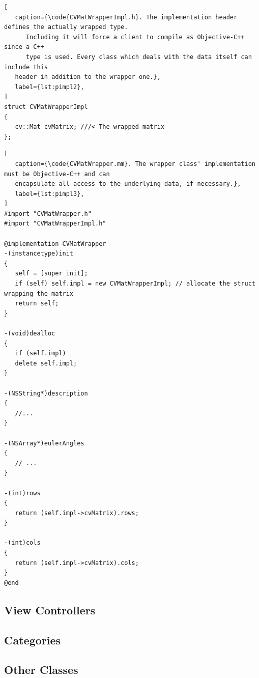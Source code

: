 \begin{lstlisting}[
   caption={\code{CVMatWrapperImpl.h}. The implementation header defines the actually wrapped type.
      Including it will force a client to compile as Objective-C++ since a C++
      type is used. Every class which deals with the data itself can include this
   header in addition to the wrapper one.},
   label={lst:pimpl2},
]
struct CVMatWrapperImpl
{
   cv::Mat cvMatrix; ///< The wrapped matrix
};
\end{lstlisting}

\begin{lstlisting}[
   caption={\code{CVMatWrapper.mm}. The wrapper class' implementation must be Objective-C++ and can
   encapsulate all access to the underlying data, if necessary.},
   label={lst:pimpl3},
]
#import "CVMatWrapper.h"
#import "CVMatWrapperImpl.h"

@implementation CVMatWrapper
-(instancetype)init
{
   self = [super init];
   if (self) self.impl = new CVMatWrapperImpl; // allocate the struct wrapping the matrix
   return self;
}

-(void)dealloc
{
   if (self.impl)
   delete self.impl;
}

-(NSString*)description
{
   //...
}

-(NSArray*)eulerAngles
{
   // ...
}

-(int)rows
{
   return (self.impl->cvMatrix).rows;
}

-(int)cols
{
   return (self.impl->cvMatrix).cols;
}
@end
\end{lstlisting}

\subsection{View Controllers}

\subsection{Categories}

\subsection{Other Classes}


